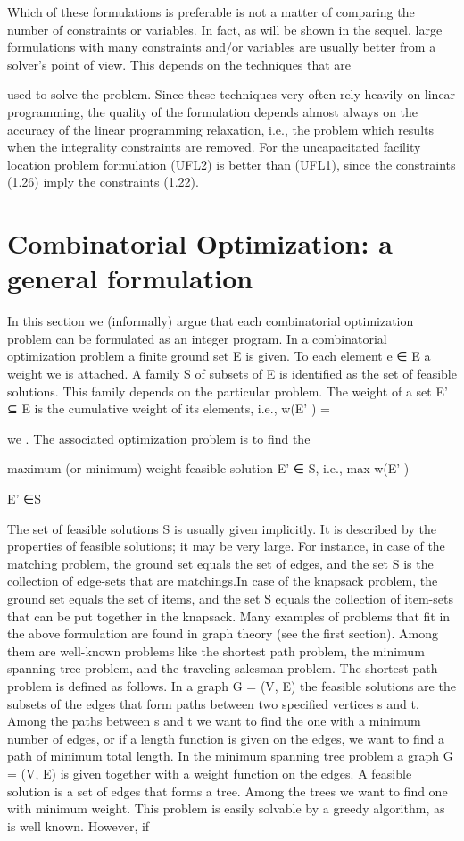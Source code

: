\documentclass[titlepage]{book}
\begin{document}

Which of these formulations is preferable is not a matter of comparing the number of constraints or
variables. In fact, as will be shown in the sequel, large formulations with many constraints and/or
variables are usually better from a solver's point of view. This depends on the techniques that are

used to solve the problem. Since these techniques very often rely heavily on linear programming, the
quality of the formulation depends almost always on the accuracy of the linear programming relaxation,
i.e., the problem which results when the integrality constraints are removed. For the uncapacitated
facility location problem formulation (UFL2) is better than (UFL1), since the constraints (1.26) imply
the constraints (1.22).

\section{Combinatorial Optimization: a general formulation}

In this section we (informally) argue that each combinatorial optimization problem can be formulated
as an integer program. In a combinatorial optimization problem a finite ground set E is given. To each
element e ∈ E a weight we is attached. A family S of subsets of E is identified as the set of feasible
solutions. This family depends on the particular problem. The weight of a set E' ⊆ E is the cumulative
weight of its elements, i.e., w(E' ) =


we . The associated optimization problem is to find the

maximum (or minimum) weight feasible solution E' ∈ S, i.e.,
max {w(E' )}

E' ∈S

The set of feasible solutions S is usually given implicitly. It is described by the properties of feasible
solutions; it may be very large. For instance, in case of the matching problem, the ground set equals
the set of edges, and the set S is the collection of edge-sets that are matchings.In case of the knapsack
problem, the ground set equals the set of items, and the set S equals the collection of item-sets that can
be put together in the knapsack.
Many examples of problems that fit in the above formulation are found in graph theory (see the first
section). Among them are well-known problems like the shortest path problem, the minimum spanning
tree problem, and the traveling salesman problem. The shortest path problem is defined as follows. In a
graph G = (V, E) the feasible solutions are the subsets of the edges that form paths between two specified
vertices s and t. Among the paths between s and t we want to find the one with a minimum number of
edges, or if a length function is given on the edges, we want to find a path of minimum total length. In
the minimum spanning tree problem a graph G = (V, E) is given together with a weight function on the
edges. A feasible solution is a set of edges that forms a tree. Among the trees we want to find one with
minimum weight. This problem is easily solvable by a greedy algorithm, as is well known. However, if
\end{document}
